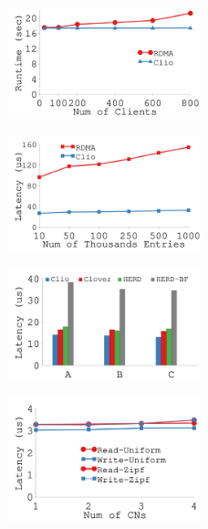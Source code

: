 {
\begin{figure}[th]
\begin{center}
\centerline{\includegraphics[width=0.5\textwidth]{clio/Figures/g_plot_image_compression.pdf}}
{
}
\end{center}
\end{figure}
}
{
\begin{figure}[h]
\begin{center}
\centerline{\includegraphics[width=0.5\textwidth]{clio/Figures/g_plot_radix_tree.pdf}}
{
}
\end{center}
\end{figure}
}
{
\begin{figure}[h]
\begin{center}
\centerline{\includegraphics[width=0.5\textwidth]{clio/Figures/g_plot_ycsb_cn.pdf}}
{
}
\end{center}
\end{figure}
}
{
\begin{figure}[h]
\begin{center}
\centerline{\includegraphics[width=0.5\textwidth]{clio/Figures/g_plot_mvstore.pdf}}
{
}
\end{center}
\end{figure}
}